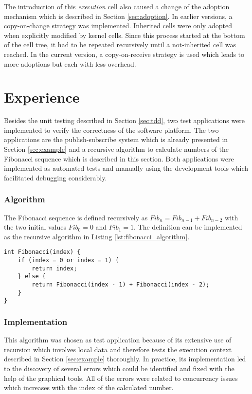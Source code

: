 The introduction of this \textit{execution} cell also caused a change of the adoption mechanism which is described in Section \ref{sec:adoption}. In earlier versions, a copy-on-change strategy was implemented. Inherited cells were only adopted when explicitly modified by kernel cells. Since this process started at the bottom of the cell tree, it had to be repeated recursively until a not-inherited cell was reached. In the current version, a copy-on-receive strategy is used which leads to more adoptions but each with less overhead.


\section{Experience}
\label{sec:experience}

Besides the unit testing described in Section \ref{sec:tdd}, two test applications were implemented to verify the correctness of the software platform. The two applications are the publish-subscribe system which is already presented in Section \ref{sec:example} and a recursive algorithm to calculate numbers of the Fibonacci sequence which is described in this section. Both applications were implemented as automated tests and manually using the development tools which facilitated debugging considerably.

\subsubsection{Algorithm}

The Fibonacci sequence is defined recursively as $Fib_n = Fib_{n-1} + Fib_{n-2}$ with the two initial values $Fib_0 = 0$ and $Fib_1 = 1$. The definition can be implemented as the recursive algorithm in Listing \ref{lst:fibonacci_algorithm}.

\begin{lstlisting}[mathescape, float=hbt, label=lst:fibonacci_algorithm, 
caption=Recursive algorithm to calculate a number of the Fibonacci sequence]
int Fibonacci(index) {
	if (index = 0 or index = 1) {
		return index;
	} else {
		return Fibonacci(index - 1) + Fibonacci(index - 2);
	}
}
\end{lstlisting}

\subsubsection{Implementation}

This algorithm was chosen as test application because of its extensive use of recursion which involves local data and therefore tests the execution context described in Section \ref{sec:example} thoroughly. In practice, its implementation led to the discovery of several errors which could be identified and fixed with the help of the graphical tools. All of the errors were related to concurrency issues which increases with the index of the calculated number.

